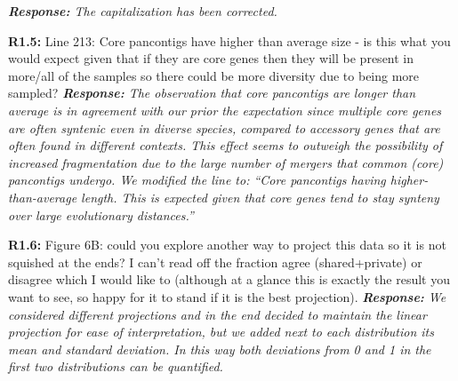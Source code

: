 \documentclass[aps,rmp,onecolumn]{revtex4-1}
\newcommand{\Marco}[1]{{\color{orange}Marco: #1}}
\newcommand{\Liam}[1]{{\color{teal}Liam: #1}}
\newcommand{\reviewer}[2]{\textbf{#1:} #2\vskip 5mm}
\newcommand{\response}[1]{{\it {\color{response}\textbf{Response:} #1}}\vskip 5mm}
\begin{document}
\response{The capitalization has been corrected.}

\reviewer{R1.5}{Line 213: Core pancontigs have higher than average size - is this what you would expect given that if they are core genes then they will be present in more/all of the samples so there could be more diversity due to being more sampled?}
\response{The observation that core pancontigs are longer than average is in agreement with our prior the expectation since multiple core genes are often syntenic even in diverse species, compared to accessory genes that are often found in different contexts. This effect seems to outweigh the possibility of increased fragmentation due to the large number of mergers that common (core) pancontigs undergo.
      We modified the line to: ``Core pancontigs having higher-than-average length. This is expected given that core genes tend to stay synteny over large evolutionary distances.''}

\reviewer{R1.6}{Figure 6B: could you explore another way to project this data so it is not squished at the ends? I can't read off the fraction agree (shared+private) or disagree which I would like to (although at a glance this is exactly the result you want to see, so happy for it to stand if it is the best projection).}
\response{We considered different projections and in the end decided to maintain the linear projection for ease of interpretation, but we added next to each distribution its mean and standard deviation. In this way both deviations from 0 and 1 in the first two distributions can be quantified.}
\end{document}

